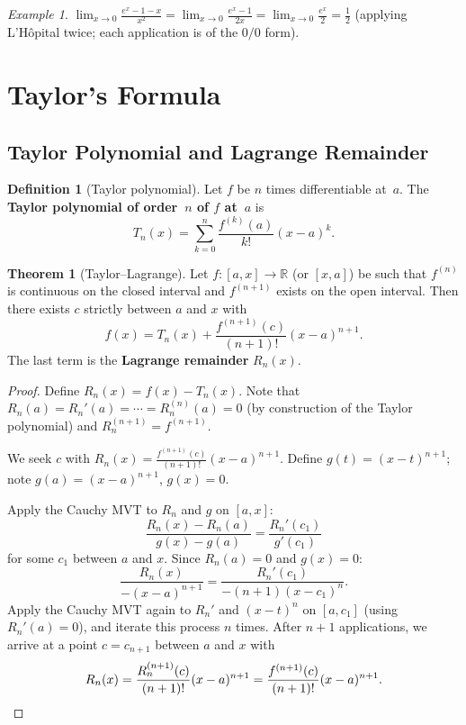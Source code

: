\documentclass[12pt,a4paper,openany]{book}
\theoremstyle{definition}
\newtheorem{definition}{Definition}[chapter]
\newtheorem{theorem}{Theorem}[chapter]
\theoremstyle{remark}
\newtheorem{example}{Example}[chapter]
\begin{document}
\begin{example}
$\displaystyle\lim_{x\to 0}\frac{e^x-1-x}{x^2}
= \lim_{x\to 0}\frac{e^x-1}{2x}
= \lim_{x\to 0}\frac{e^x}{2} = \frac{1}{2}$
(applying L'H\^opital twice; each application is of the $0/0$ form).
\end{example}

\section{Taylor's Formula}

\subsection{Taylor Polynomial and Lagrange Remainder}

\begin{definition}[Taylor polynomial]\label{def:taylor-poly}
Let $f$ be $n$ times differentiable at~$a$.  The \textbf{Taylor
polynomial of order~$n$ of $f$ at~$a$} is
\[
  T_n(x) = \sum_{k=0}^{n}\frac{f^{(k)}(a)}{k!}(x-a)^k.
\]
\end{definition}

\begin{theorem}[Taylor--Lagrange]\label{thm:taylor-lagrange}
Let $f\colon[a,x]\to\mathbb{R}$ (or $[x,a]$) be such that $f^{(n)}$
is continuous on the closed interval and $f^{(n+1)}$ exists on the
open interval.  Then there exists $c$ strictly between $a$ and $x$
with
\[
  f(x) = T_n(x) + \frac{f^{(n+1)}(c)}{(n+1)!}(x-a)^{n+1}.
\]
The last term is the \textbf{Lagrange remainder} $R_n(x)$.
\end{theorem}

\begin{proof}
Define $R_n(x)=f(x)-T_n(x)$.  Note that $R_n(a)=R_n'(a)=\cdots
=R_n^{(n)}(a)=0$ (by construction of the Taylor polynomial) and
$R_n^{(n+1)}=f^{(n+1)}$.

We seek $c$ with $R_n(x)=\frac{f^{(n+1)}(c)}{(n+1)!}(x-a)^{n+1}$.
Define $g(t)=(x-t)^{n+1}$; note $g(a)=(x-a)^{n+1}$, $g(x)=0$.

Apply the Cauchy MVT to $R_n$ and $g$ on $[a,x]$:
\[
  \frac{R_n(x)-R_n(a)}{g(x)-g(a)}
  = \frac{R_n'(c_1)}{g'(c_1)}
\]
for some $c_1$ between $a$ and $x$.  Since $R_n(a)=0$ and $g(x)=0$:
\[
  \frac{R_n(x)}{-(x-a)^{n+1}}
  = \frac{R_n'(c_1)}{-(n+1)(x-c_1)^n}.
\]
Apply the Cauchy MVT again to $R_n'$ and $(x-t)^n$ on $[a,c_1]$
(using $R_n'(a)=0$), and iterate this process $n$ times.  After $n+1$
applications, we arrive at a point $c=c_{n+1}$ between $a$ and $x$
with
\[
  R_n(x) = \frac{R_n^{(n+1)}(c)}{(n+1)!}(x-a)^{n+1}
  = \frac{f^{(n+1)}(c)}{(n+1)!}(x-a)^{n+1}. \qedhere
\]
\end{proof}
\end{document}
